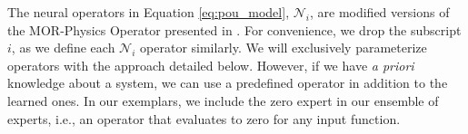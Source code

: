 The neural operators in Equation \eqref{eq:pou_model}, $\mathcal{N}_i$, are modified versions of the MOR-Physics Operator presented in \cite{patel2018MOR_Operator,patel2021MOR_Operator2}. For convenience, we drop the subscript $i$, as we define each $\mathcal{N}_i$ operator similarly. We will exclusively parameterize operators with the approach detailed below. However, if we have \textit{a priori} knowledge about a system, we can use a predefined operator in addition to the learned ones. In our exemplars, we include the zero expert in our ensemble of experts, i.e., an operator that evaluates to zero for any input function.

